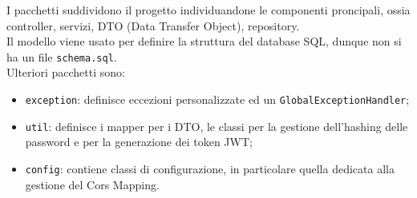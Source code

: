 \begin{figure}[h]
    \centering
    \begin{minipage}{7cm}
    \end{minipage}
\end{figure}

\noindent
I pacchetti suddividono il progetto individuandone le componenti proncipali, ossia controller, servizi, DTO (Data Transfer Object), repository.\\
Il modello viene usato per definire la struttura del database SQL, dunque non si ha un file \texttt{schema.sql}.\\
\noindent
Ulteriori pacchetti sono:
\begin{itemize}
    \item \texttt{exception}: definisce eccezioni personalizzate ed un \texttt{GlobalExceptionHandler};
    \item \texttt{util}: definisce i mapper per i DTO, le classi per la gestione dell'hashing delle password e per la generazione dei token JWT;
    \item \texttt{config}: contiene classi di configurazione, in particolare quella dedicata alla gestione del Cors Mapping.
\end{itemize}
